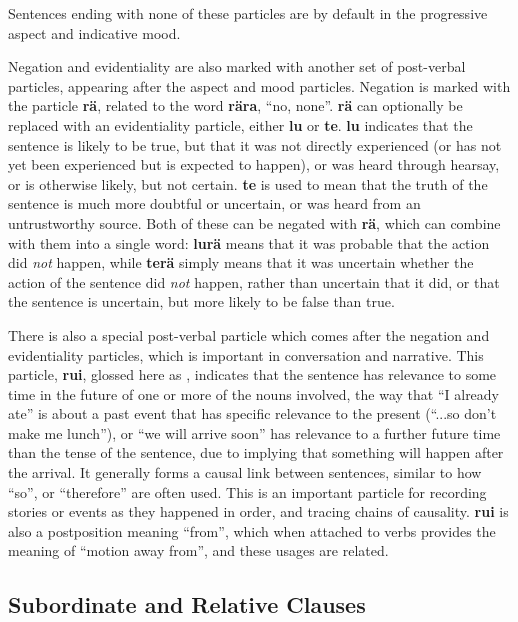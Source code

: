 \documentclass{article}
\begin{document}
Sentences ending with none of these particles are by default in the progressive aspect and indicative mood.

Negation and evidentiality are also marked with another set of post-verbal particles, appearing after the aspect and mood particles.  Negation is marked with the particle \textbf{r\"a}, related to the word \textbf{r\"ara}, ``no, none''.  \textbf{r\"a} can optionally be replaced with an evidentiality particle, either \textbf{lu} or \textbf{te}.  \textbf{lu} indicates that the sentence is likely to be true, but that it was not directly experienced (or has not yet been experienced but is expected to happen), or was heard through hearsay, or is otherwise likely, but not certain.  \textbf{te} is used to mean that the truth of the sentence is much more doubtful or uncertain, or was heard from an untrustworthy source.  Both of these can be negated with \textbf{r\"a}, which can combine with them into a single word: \textbf{lur\"a} means that it was probable that the action did \emph{not} happen, while \textbf{ter\"a} simply means that it was uncertain whether the action of the sentence did \emph{not} happen, rather than uncertain that it did, or that the sentence is uncertain, but more likely to be false than true.

There is also a special post-verbal particle which comes after the negation and evidentiality particles, which is important in conversation and narrative.  This particle, \textbf{rui}, glossed here as , indicates that the sentence has relevance to some time in the future of one or more of the nouns involved, the way that ``I already ate'' is about a past event that has specific relevance to the present (``...so don't make me lunch''), or ``we will arrive soon'' has relevance to a further future time than the tense of the sentence, due to implying that something will happen after the arrival.  It generally forms a causal link between sentences, similar to how ``so'', or ``therefore'' are often used.  This is an important particle for recording stories or events as they happened in order, and tracing chains of causality.  \textbf{rui} is also a postposition meaning ``from'', which when attached to verbs provides the meaning of ``motion away from'', and these usages are related.

\subsection{Subordinate and Relative Clauses}
\end{document}
